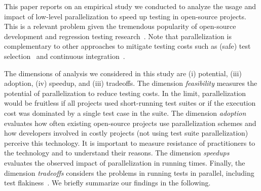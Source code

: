 

This paper reports on an empirical study we conducted to analyze the
usage and impact of low-level parallelization to speed up testing in
open-source projects.  This is a relevant problem given the tremendous
popularity of open-source development and regression testing
research~\cite{yoo-harman-stvr2012}.  Note that parallelization is
complementary to other approaches to mitigate testing costs such as
(safe) test
selection~\cite{Rothermel:1997:SER:248233.248262,gligoric-etal-issta2015}
and continuous integration~\cite{Saff:2003:RWD:951952.952340}.

The dimensions of analysis we considered in this study are (i)
potential, (iii) adoption, (iv) speedup, and (iii) tradeoffs.  The
dimension \emph{feasibility} measures the potential of parallelization
to reduce testing costs.  In the limit, parallelization would be
fruitless if all projects used short-running test suites or if the
execution cost was dominated by a single test case in the suite.  The
dimension \emph{adoption} evaluates how often existing open-source
projects use parallelization schemes and how developers involved in
costly projects (not using test suite parallelization) perceive this
technology.  It is important to measure resistance of practitioners to
the technology and to understand their reasons.  The dimension
\emph{speedups} evaluates the observed impact of
parallelization in running times.  Finally, the dimension
\emph{tradeoffs} considers the problems in running tests in parallel,
including test flakiness~\cite{luo-etal-fse2014}.  We briefly
summarize our findings in the following.

